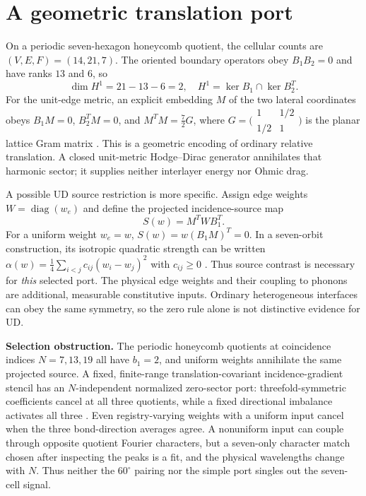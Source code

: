 \documentclass[9pt,a4paper,twocolumn]{extarticle}
\begin{document}
\section{A geometric translation port}
On a periodic seven-hexagon honeycomb quotient, the cellular counts are $(V,E,F)=(14,21,7)$. The oriented boundary operators obey $B_1B_2=0$ and have ranks $13$ and $6$, so
\begin{equation}
 \dim H^1=21-13-6=2,\quad H^1=\ker B_1\cap\ker B_2^T. \label{eq:h1}
\end{equation}
For the unit-edge metric, an explicit embedding $M$ of the two lateral coordinates obeys $B_1M=0$, $B_2^TM=0$, and $M^TM=\frac72G$, where $G=\bigl(\begin{smallmatrix}1&1/2\\1/2&1\end{smallmatrix}\bigr)$ is the planar lattice Gram matrix \cite{udrecord}. This is a geometric encoding of ordinary relative translation. A closed unit-metric Hodge--Dirac generator annihilates that harmonic sector; it supplies neither interlayer energy nor Ohmic drag.

A possible UD source restriction is more specific. Assign edge weights $W=\operatorname{diag}(w_e)$ and define the projected incidence-source map
\begin{equation}
 S(w)=M^TWB_1^T. \label{eq:source}
\end{equation}
For a uniform weight $w_e=w$, $S(w)=w(B_1M)^T=0$. In a seven-orbit construction, its isotropic quadratic strength can be written $\alpha(w)=\frac14\sum_{i<j}c_{ij}(w_i-w_j)^2$ with $c_{ij}\geq0$ \cite{udrecord}. Thus source contrast is necessary for \emph{this} selected port. The physical edge weights and their coupling to phonons are additional, measurable constitutive inputs. Ordinary heterogeneous interfaces can obey the same symmetry, so the zero rule alone is not distinctive evidence for UD.

\textbf{Selection obstruction.} The periodic honeycomb quotients at coincidence indices $N=7,13,19$ all have $b_1=2$, and uniform weights annihilate the same projected source. A fixed, finite-range translation-covariant incidence-gradient stencil has an $N$-independent normalized zero-sector port: threefold-symmetric coefficients cancel at all three quotients, while a fixed directional imbalance activates all three \cite{udphysics}. Even registry-varying weights with a uniform input cancel when the three bond-direction averages agree. A nonuniform input can couple through opposite quotient Fourier characters, but a seven-only character match chosen after inspecting the peaks is a fit, and the physical wavelengths change with $N$. Thus neither the $60^\circ$ pairing nor the simple port singles out the seven-cell signal.
\end{document}

